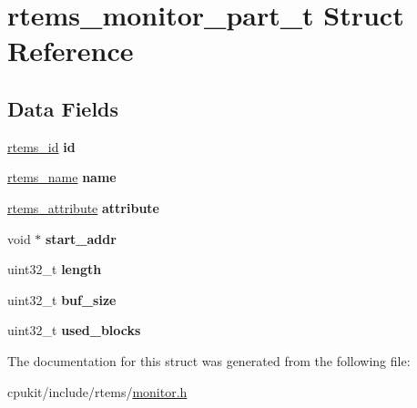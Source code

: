 \hypertarget{structrtems__monitor__part__t}{}\section{rtems\+\_\+monitor\+\_\+part\+\_\+t Struct Reference}
\label{structrtems__monitor__part__t}
\subsection*{Data Fields}
\begin{DoxyCompactItemize}
\item 
\mbox{\label{structrtems__monitor__part__t_a9c7b38ea53f25f80912a110484df87e7}} 
\mbox{\hyperlink{group__ClassicTasks_gab20892b814dced7dd4e5b9bf42becd57}{rtems\+\_\+id}} {\bfseries id}
\item 
\mbox{\label{structrtems__monitor__part__t_a24c20ef4f6036e056c1af56ec989c9c2}} 
\mbox{\hyperlink{group__ClassicTasks_ga55fb63c49f68c0cbd9bee004da15b1fd}{rtems\+\_\+name}} {\bfseries name}
\item 
\mbox{\label{structrtems__monitor__part__t_ab862f98df340befcf4146822e155906d}} 
\mbox{\hyperlink{group__ClassicAttributes_gaea40313cf78ed843e09c4315d0a10f79}{rtems\+\_\+attribute}} {\bfseries attribute}
\item 
\mbox{\label{structrtems__monitor__part__t_aa5d53fbffc0a9e518bcefe90a062e766}} 
void $\ast$ {\bfseries start\+\_\+addr}
\item 
\mbox{\label{structrtems__monitor__part__t_ac3793d4810d28ebc9d30802dfb868e4b}} 
uint32\+\_\+t {\bfseries length}
\item 
\mbox{\label{structrtems__monitor__part__t_a34546aa5a2c59abc7fffcf7d42fc965f}} 
uint32\+\_\+t {\bfseries buf\+\_\+size}
\item 
\mbox{\label{structrtems__monitor__part__t_af48fbedd00cc298d127282152e74b111}} 
uint32\+\_\+t {\bfseries used\+\_\+blocks}
\end{DoxyCompactItemize}


The documentation for this struct was generated from the following file\+:\begin{DoxyCompactItemize}
\item 
cpukit/include/rtems/\mbox{\hyperlink{monitor_8h}{monitor.\+h}}\end{DoxyCompactItemize}

